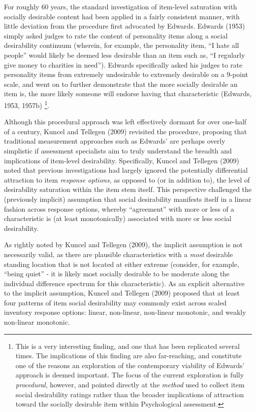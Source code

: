 \documentclass[
  ,jou]{apa6}
\begin{document}
For roughly 60 years, the standard investigation of item-level saturation with socially desirable content had been applied in a fairly consistent manner, with little deviation from the procedure first advocated by Edwards. Edwards (1953) simply asked judges to rate the content of personality items along a social desirability continuum (wherein, for example, the personality item, ``I hate all people'' would likely be deemed less desirable than an item such as, ``I regularly give money to charities in need''). Edwards specifically asked his judges to rate personality items from extremely undesirable to extremely desirable on a 9-point scale, and went on to further demonstrate that the more socially desirable an item is, the more likely someone will endorse having that characteristic (Edwards, 1953, 1957b) \footnote{This is a very interesting finding, and one that has been replicated several times. The implications of this finding are also far-reaching, and constitute one of the reasons an exploration of the contemporary viability of Edwards' approach is deemed important. The focus of the current exploration is fully \emph{procedural}, however, and pointed directly at the \emph{method} used to collect item social desirability ratings rather than the broader implications of attraction toward the socially desirable item within Psychological assessment.}.

Although this procedural approach was left effectively dormant for over one-half of a century, Kuncel and Tellegen (2009) revisited the procedure, proposing that traditional measurement approaches such as Edwards' are perhaps overly simplistic if assessment specialists aim to truly understand the breadth and implications of item-level desirability. Specifically, Kuncel and Tellegen (2009) noted that previous investigations had largely ignored the potentially differential attraction to item \emph{response options}, as opposed to (or in addition to), the level of desirability saturation within the item stem itself. This perspective challenged the (previously implicit) assumption that social desirability manifests itself in a linear fashion across response options, whereby ``agreement'' with more or less of a characteristic is (at least monotonically) associated with more or less social desirability.

As rightly noted by Kuncel and Tellegen (2009), the implicit assumption is not necessarily valid, as there are plausible characteristics with a \emph{most} desirable standing location that is not located at either extreme (consider, for example, ``being quiet'' - it is likely most socially desirable to be moderate along the individual difference spectrum for this characteristic). As an explicit alternative to the implicit assumption, Kuncel and Tellegen (2009) proposed that at least four patterns of item social desirability may commonly exist across scaled inventory response options: linear, non-linear, non-linear monotonic, and weakly non-linear monotonic.
\end{document}
